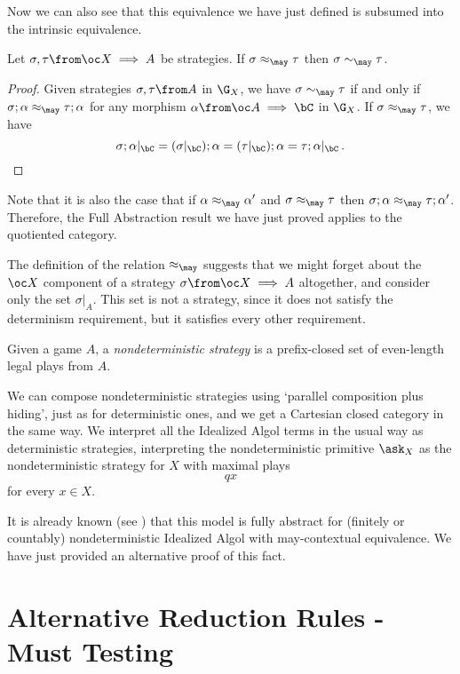 Now we can also see that this equivalence we have just defined is subsumed into the intrinsic equivalence.
\begin{proposition}
  Let $\sigma,\tau\from \oc X \implies A$ be strategies.  
  If $\sigma\approx_{\may}\tau$ then $\sigma\sim_{\may} \tau$.
\end{proposition}
\begin{proof}
  Given strategies $\sigma,\tau\from A$ in $\G_X$, we have $\sigma \sim_{\may} \tau$ if and only if $\sigma;\alpha\approx_{\may}\tau;\alpha$ for any morphism $\alpha\from \oc A \implies \bC$ in $\G_X$.
  If $\sigma\approx_{\may}\tau$, we have
  \[
    \sigma;\alpha\vert_{\bC} = (\sigma\vert_{\bC});\alpha = (\tau\vert_{\bC});\alpha = \tau;\alpha\vert_{\bC}\,.\qedhere
    \]
\end{proof}

Note that it is also the case that if $\alpha\approx_{\may}\alpha'$ and $\sigma\approx_{\may}\tau$ then $\sigma;\alpha \approx_{\may} \tau;\alpha'$.  
Therefore, the Full Abstraction result we have just proved applies to the quotiented category.

The definition of the relation $\approx_{\may}$ suggests that we might forget about the $\oc X$ component of a strategy $\sigma\from\oc X \implies A$ altogether, and consider only the set $\sigma\vert_A$.  
This set is not a strategy, since it does not satisfy the determinism requirement, but it satisfies every other requirement.

\begin{definition}
  Given a game $A$, a \emph{nondeterministic strategy} is a prefix-closed set of even-length legal plays from $A$.
\end{definition}

We can compose nondeterministic strategies using `parallel composition plus hiding', just as for deterministic ones, and we get a Cartesian closed category in the same way.  
We interpret all the Idealized Algol terms in the usual way as deterministic strategies, interpreting the nondeterministic primitive $\ask_X$ as the nondeterministic strategy for $X$ with maximal plays
\[
  qx
  \]
for every $x\in X$.

It is already known (see \cite{mcCHFiniteND}) that this model is fully abstract for (finitely or countably) nondeterministic Idealized Algol with may-contextual equivalence.
We have just provided an alternative proof of this fact.

\section{Alternative Reduction Rules - Must Testing}

